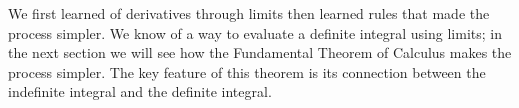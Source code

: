 We first learned of derivatives through limits then learned rules that made the process simpler. We know of a way to evaluate a definite integral using limits; in the next section we will see how the Fundamental Theorem of Calculus makes the process simpler. The key feature of this theorem is its connection between the indefinite integral and the definite integral.

